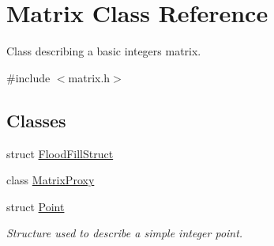 \hypertarget{classMatrix}{
\section{Matrix Class Reference}
\label{classMatrix}
}


Class describing a basic integers matrix.  




{\ttfamily \#include $<$matrix.h$>$}

\subsection*{Classes}
\begin{DoxyCompactItemize}
\item 
struct \hyperlink{structMatrix_1_1FloodFillStruct}{FloodFillStruct}
\item 
class \hyperlink{classMatrix_1_1MatrixProxy}{MatrixProxy}
\item 
struct \hyperlink{structMatrix_1_1Point}{Point}
\begin{DoxyCompactList}\small\item\em Structure used to describe a simple integer point. \item\end{DoxyCompactList}\end{DoxyCompactItemize}
